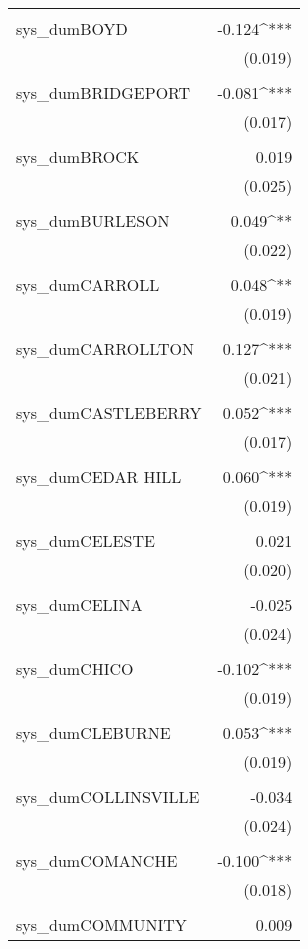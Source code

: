 \begin{table}[!htbp]
\begin{tabular}{@{\extracolsep{5pt}}lD{.}{.}{-3} }
  & \\ 
 sys\_dumBOYD & -0.124^{***} \\ 
  & (0.019) \\ 
  & \\ 
 sys\_dumBRIDGEPORT & -0.081^{***} \\ 
  & (0.017) \\ 
  & \\ 
 sys\_dumBROCK & 0.019 \\ 
  & (0.025) \\ 
  & \\ 
 sys\_dumBURLESON & 0.049^{**} \\ 
  & (0.022) \\ 
  & \\ 
 sys\_dumCARROLL & 0.048^{**} \\ 
  & (0.019) \\ 
  & \\ 
 sys\_dumCARROLLTON & 0.127^{***} \\ 
  & (0.021) \\ 
  & \\ 
 sys\_dumCASTLEBERRY & 0.052^{***} \\ 
  & (0.017) \\ 
  & \\ 
 sys\_dumCEDAR HILL & 0.060^{***} \\ 
  & (0.019) \\ 
  & \\ 
 sys\_dumCELESTE & 0.021 \\ 
  & (0.020) \\ 
  & \\ 
 sys\_dumCELINA & -0.025 \\ 
  & (0.024) \\ 
  & \\ 
 sys\_dumCHICO & -0.102^{***} \\ 
  & (0.019) \\ 
  & \\ 
 sys\_dumCLEBURNE & 0.053^{***} \\ 
  & (0.019) \\ 
  & \\ 
 sys\_dumCOLLINSVILLE & -0.034 \\ 
  & (0.024) \\ 
  & \\ 
 sys\_dumCOMANCHE & -0.100^{***} \\ 
  & (0.018) \\ 
  & \\ 
 sys\_dumCOMMUNITY & 0.009 \\ 

\end{tabular}
\end{table}
